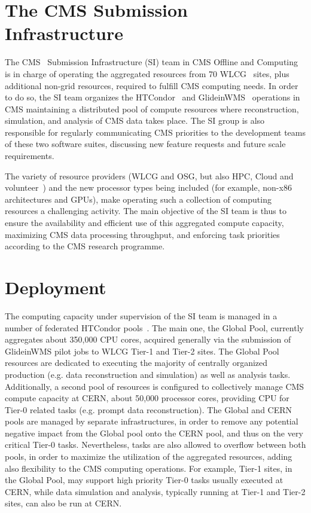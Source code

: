 \documentclass[a4paper]{jpconf}
\begin{document}
\section{The CMS Submission Infrastructure}\label{sec:intro}
The CMS~\cite{cms} Submission Infrastructure (SI) team in CMS Offline and Computing is in charge of operating the aggregated resources from 70 WLCG~\cite{wlcg} sites, plus additional non-grid resources, required to fulfill CMS computing needs. In order to do so, the SI team organizes the HTCondor~\cite{htcondor} and GlideinWMS~\cite{gwms} operations in CMS maintaining a distributed pool of compute resources where reconstruction, simulation, and analysis of CMS data takes place. The SI group is also responsible for regularly communicating CMS priorities to the development teams of these two software suites, discussing new feature requests and future scale requirements.

The variety of resource providers (WLCG and OSG, but also HPC, Cloud and volunteer~\cite{lhcathome}) and the new processor types being included (for example, non-x86 architectures and GPUs), make operating such a collection of computing resources a challenging activity. The main objective of the SI team is thus to ensure the availability and efficient use of this aggregated compute capacity, maximizing CMS data processing throughput, and enforcing task priorities according to the CMS research programme.

\section{Deployment}\label{sec:deployment}
The computing capacity under supervision of the SI team is managed in a number of federated HTCondor pools~\cite{sicomplexity}. The main one, the Global Pool, currently aggregates about 350,000 CPU cores, acquired generally via the submission of GlideinWMS pilot jobs to WLCG Tier-1 and Tier-2 sites. The Global Pool resources are dedicated to executing the majority of centrally organized production (e.g. data reconstruction and simulation) as well as analysis tasks. Additionally, a second pool of resources is configured to collectively manage CMS compute capacity at CERN, about 50,000 processor cores, providing CPU for Tier-0 related tasks (e.g. prompt data reconstruction). The Global and CERN pools are managed by separate infrastructures, in order to remove any potential negative impact from the Global pool onto the CERN pool, and thus on the very critical Tier-0 tasks. Nevertheless, tasks are also allowed to overflow between both pools, in order to maximize the utilization of the aggregated resources, adding also flexibility to the CMS computing operations. For example, Tier-1 sites, in the Global Pool, may support high priority Tier-0 tasks usually executed at CERN, while data simulation and analysis, typically running at Tier-1 and Tier-2 sites, can also be run at CERN.  
\end{document}
